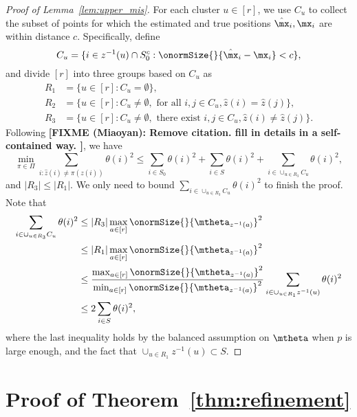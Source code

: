 \documentclass[lettersize,onecolumn,journal]{IEEEtran}
\theoremstyle{definition}
\theoremstyle{definition}
\def\fixme#1#2{\textbf{\color{red}[FIXME (#1): #2]}}
\begin{document}
\begin{proof}[Proof of Lemma~\ref{lem:upper_mis}] 

For each cluster $u\in[r]$, we use $C_u$ to collect the subset of points for which the estimated and true positions $\hat \mx_i, \mx_i$ are within distance $c$. Specifically, define
\begin{equation}
    C_u = \{ i \in z^{-1}(u) \cap S_0^c: \onormSize{}{\hat \mx_i - \mx_i} < c \},
\end{equation}
and divide $[r]$ into three groups based on $C_u$ as 
\begin{align}
    R_1 &= \{ u \in [r]: C_u = \emptyset \},\\
    R_2 &= \{ u \in [r]: C_u \neq \emptyset, \text{ for all } i, j \in C_u, \hat z(i) = \hat z(j) \},\\
    R_3 &= \{ u \in [r]: C_u \neq \emptyset, \text{ there exist } i, j \in C_u, \hat z(i) \neq \hat z(j) \}.
\end{align}
Following \citet[Lemma 6]{gao2018community} \fixme{Miaoyan}{Remove citation. fill in details in a self-contained way. }, we have 
\begin{equation}
    \min_{\pi \in \Pi} \sum_{i : \hat z(i) \neq \pi(z(i))} \theta(i)^2 \leq \sum_{i \in S_0} \theta(i)^2 + \sum_{i \in S} \theta(i)^2 + \sum_{ i \in \cup_{u \in R_3} C_u} \theta(i)^2,
\end{equation}
and $|R_3| \leq |R_1|$. We only need to bound $\sum_{ i \in \cup_{u \in R_3} C_u} \theta(i)^2$ to finish the proof. Note that 
\begin{align}
    \sum_{ i \in \cup_{u \in R_3} C_u} \theta(i)^2 &\leq |R_3| \max_{a \in [r]} \onormSize{}{\mtheta_{z^{-1}(a)}}^2 \\
    & \leq |R_1| \max_{a \in [r]} \onormSize{}{\mtheta_{z^{-1}(a)}}^2  \\
    & \leq {\max_{a \in [r]} \onormSize{}{\mtheta_{z^{-1}(a)}}^2 \over \min_{a \in [r]} \onormSize{}{\mtheta_{z^{-1}(a)}}^2 } \sum_{i \in \cup_{u \in R_1} z^{-1}(u)} \theta(i)^2\\
    & \leq 2 \sum_{i \in S} \theta(i)^2,
\end{align}
where the last inequality holds by the balanced assumption on $\mtheta$ when $p$ is large enough, and the fact that $ \cup_{u \in R_1} z^{-1}(u) \subset S$.
\end{proof}

\section*{Proof of Theorem~\ref{thm:refinement}}
\end{document}
